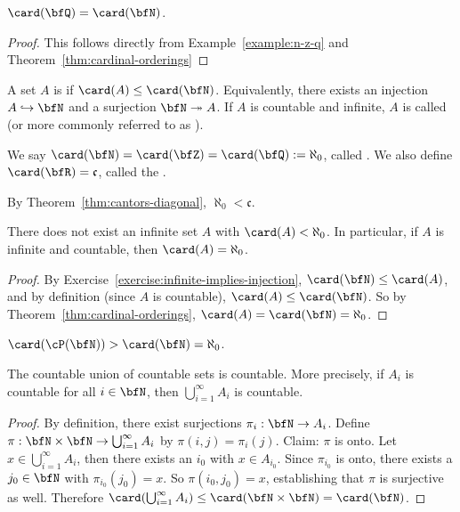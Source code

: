     \begin{corollary}
        $\card(\bfQ) = \card(\bfN)$.
    \end{corollary}
        \begin{proof}
            This follows directly from Example~\ref{example:n-z-q} and Theorem~\ref{thm:cardinal-orderings}
        \end{proof}

    \begin{definition}
        A set $A$ is  if $\card(A) \leq \card(\bfN)$. Equivalently, there exists an injection $A \hookrightarrow \bfN$ and a surjection $\bfN \twoheadrightarrow A$. If $A$ is countable and infinite, $A$ is called  (or more commonly referred to as ).
    \end{definition}

    \begin{definition}
        We say $\card(\bfN) = \card(\bfZ) = \card(\bfQ) := \aleph_0$, called . We also define $\card(\bfR) = \mathfrak{c}$, called the .
    \end{definition}

    \begin{example}
        By Theorem~\ref{thm:cantors-diagonal}, $\aleph_0 < \mathfrak{c}$.
    \end{example}

    \begin{corollary}
        There does not exist an infinite set $A$ with $\card(A) < \aleph_0$. In particular, if $A$ is infinite and countable, then $\card(A) = \aleph_0$.
    \end{corollary}
        \begin{proof}
            By Exercise~\ref{exercise:infinite-implies-injection}, $\card(\bfN) \leq \card(A)$, and by definition (since $A$ is countable), $\card(A) \leq \card(\bfN)$. So by Theorem~\ref{thm:cardinal-orderings}, $\card(A) = \card(\bfN) = \aleph_0$.
        \end{proof}

    \begin{example}
        $\card(\cP(\bfN)) > \card(\bfN) = \aleph_0$.
    \end{example}

    \begin{proposition}
        The countable union of countable sets is countable. More precisely, if $A_i$ is countable for all $i \in \bfN$, then $\bigcup_{i = 1}^\infty A_i$ is countable.
    \end{proposition}
        \begin{proof}
            By definition, there exist surjections $\pi_i : \bfN \rightarrow A_i$. Define $\pi: \bfN \times \bfN \rightarrow \bigcup_{i = 1}^\infty A_i$ by $\pi(i,j) = \pi_i (j)$. Claim: $\pi$ is onto. Let $x \in \bigcup_{i = 1}^\infty A_i$, then there exists an $i_0$ with $x \in A_{i_0}$. Since $\pi_{i_0}$ is onto, there exists a $j_0 \in \bfN$ with $\pi_{i_0}(j_0) = x$. So $\pi(i_0,j_0) = x$, establishing that $\pi$ is surjective as well. Therefore $\card(\bigcup_{i = 1}^\infty A_i) \leq \card(\bfN \times \bfN) = \card(\bfN)$.
        \end{proof}
    
